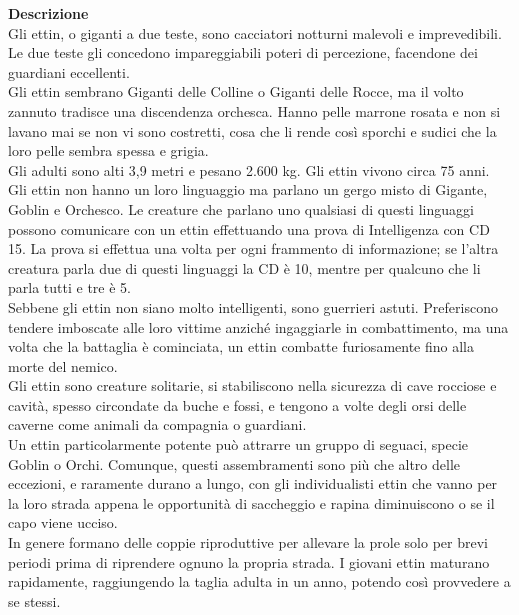 \begin{multicols}{2}
\textbf{Descrizione}\\
Gli ettin, o giganti a due teste, sono cacciatori notturni malevoli e imprevedibili. Le due teste gli concedono impareggiabili poteri di percezione, facendone dei guardiani eccellenti.\\
Gli ettin sembrano Giganti delle Colline o Giganti delle Rocce, ma il volto zannuto tradisce una discendenza orchesca. Hanno pelle marrone rosata e non si lavano mai se non vi sono costretti, cosa che li rende così sporchi e sudici che la loro pelle sembra spessa e grigia.\\
Gli adulti sono alti 3,9 metri e pesano 2.600 kg. Gli ettin vivono circa 75 anni.\\
Gli ettin non hanno un loro linguaggio ma parlano un gergo misto di Gigante, Goblin e Orchesco. Le creature che parlano uno qualsiasi di questi linguaggi possono comunicare con un ettin effettuando una prova di Intelligenza con CD 15. La prova si effettua una volta per ogni frammento di informazione; se l'altra creatura parla due di questi linguaggi la CD è 10, mentre per qualcuno che li parla tutti e tre è 5.\\
Sebbene gli ettin non siano molto intelligenti, sono guerrieri astuti. Preferiscono tendere imboscate alle loro vittime anziché ingaggiarle in combattimento, ma una volta che la battaglia è cominciata, un ettin combatte furiosamente fino alla morte del nemico.\\
Gli ettin sono creature solitarie, si stabiliscono nella sicurezza di cave rocciose e cavità, spesso circondate da buche e fossi, e tengono a volte degli orsi delle caverne come animali da compagnia o guardiani.\\
Un ettin particolarmente potente può attrarre un gruppo di seguaci, specie Goblin o Orchi. Comunque, questi assembramenti sono più che altro delle eccezioni, e raramente durano a lungo, con gli individualisti ettin che vanno per la loro strada appena le opportunità di saccheggio e rapina diminuiscono o se il capo viene ucciso.\\
In genere formano delle coppie riproduttive per allevare la prole solo per brevi periodi prima di riprendere ognuno la propria strada. I giovani ettin maturano rapidamente, raggiungendo la taglia adulta in un anno, potendo così provvedere a se stessi.\\


\end{multicols}
